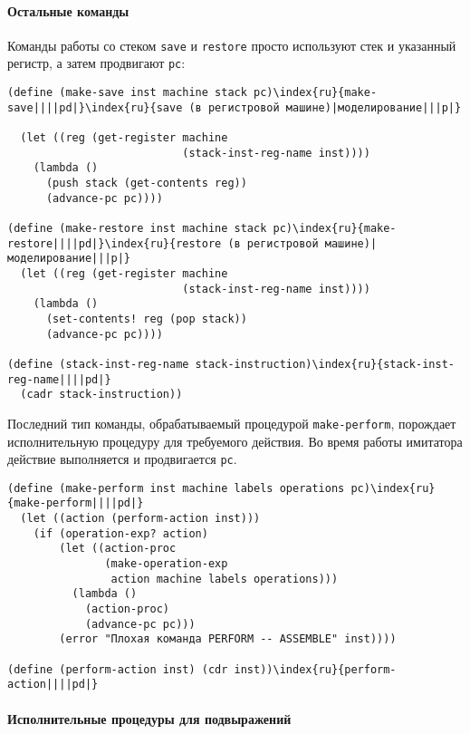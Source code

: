 \paragraph{Остальные команды}


Команды работы со стеком {\tt save} и
{\tt restore} просто используют стек и указанный регистр, а
затем продвигают {\tt pc}:

\begin{Verbatim}[fontsize=\small]
(define (make-save inst machine stack pc)\index{ru}{make-save||||pd|}\index{ru}{save (в регистровой машине)|моделирование|||p|}

  (let ((reg (get-register machine
                           (stack-inst-reg-name inst))))
    (lambda ()
      (push stack (get-contents reg))
      (advance-pc pc))))

(define (make-restore inst machine stack pc)\index{ru}{make-restore||||pd|}\index{ru}{restore (в регистровой машине)|моделирование|||p|}
  (let ((reg (get-register machine
                           (stack-inst-reg-name inst))))
    (lambda ()
      (set-contents! reg (pop stack))    
      (advance-pc pc))))

(define (stack-inst-reg-name stack-instruction)\index{ru}{stack-inst-reg-name||||pd|}
  (cadr stack-instruction))
\end{Verbatim}

Последний тип команды, обрабатываемый процедурой
{\tt make-perform}, порождает исполнительную процедуру для
требуемого действия.  Во время работы имитатора действие выполняется
и продвигается {\tt pc}.

\begin{Verbatim}[fontsize=\small]
(define (make-perform inst machine labels operations pc)\index{ru}{make-perform||||pd|}
  (let ((action (perform-action inst)))
    (if (operation-exp? action)
        (let ((action-proc
               (make-operation-exp
                action machine labels operations)))
          (lambda ()
            (action-proc)
            (advance-pc pc)))
        (error "Плохая команда PERFORM -- ASSEMBLE" inst))))

(define (perform-action inst) (cdr inst))\index{ru}{perform-action||||pd|}
\end{Verbatim}

\paragraph{Исполнительные процедуры для подвыражений}


